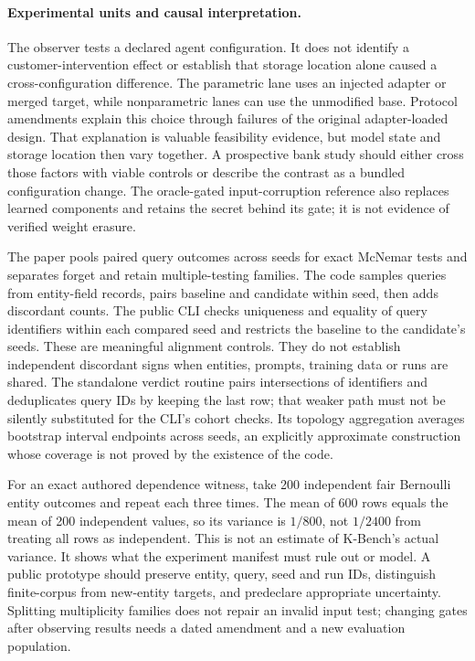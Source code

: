 \paragraph{Experimental units and causal interpretation.}
The observer tests a declared agent configuration. It does not identify a
customer-intervention effect or establish that storage location alone caused
a cross-configuration difference. The parametric lane uses an injected adapter
or merged target, while nonparametric lanes can use the unmodified base.
Protocol amendments explain this choice through failures of the original
adapter-loaded design. That explanation is valuable feasibility evidence,
but model state and storage location then vary together. A prospective bank
study should either cross those factors with viable controls or describe the
contrast as a bundled configuration change. The oracle-gated input-corruption
reference also replaces learned components and retains the secret behind its
gate; it is not evidence of verified weight erasure.
\citep{exec24_unlearning_original,exec24_unlearning_software}

The paper pools paired query outcomes across seeds for exact McNemar tests and
separates forget and retain multiple-testing families. The code samples queries
from entity-field records, pairs baseline and candidate within seed, then adds
discordant counts. The public CLI checks uniqueness and equality of query
identifiers within each compared seed and restricts the baseline to the
candidate's seeds. These are meaningful alignment controls. They do not establish
independent discordant signs when entities, prompts, training data or runs are
shared. The standalone verdict routine pairs intersections of identifiers and
deduplicates query IDs by keeping the last row; that weaker path must not be
silently substituted for the CLI's cohort checks. Its topology aggregation
averages bootstrap interval endpoints across seeds, an explicitly approximate
construction whose coverage is not proved by the existence of the code.
\citep{exec24_unlearning_original,exec24_unlearning_software}

For an exact authored dependence witness, take 200 independent fair Bernoulli
entity outcomes and repeat each three times. The mean of 600 rows equals the
mean of 200 independent values, so its variance is $1/800$, not $1/2400$ from
treating all rows as independent. This is not an estimate of K-Bench's actual
variance. It shows what the experiment manifest must rule out or model. A public
prototype should preserve entity, query, seed and run IDs, distinguish
finite-corpus from new-entity targets, and predeclare appropriate uncertainty.
Splitting multiplicity families does not repair an invalid input test; changing
gates after observing results needs a dated amendment and a new evaluation
population.~\citep{exec24_unlearning_reference,exec24_unlearning_software}


